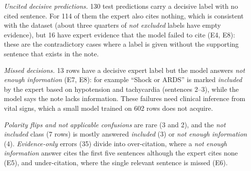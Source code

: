\emph{Uncited decisive predictions.} 130 test predictions carry a decisive label with no cited sentence. For 114 of them the expert also cites nothing, which is consistent with the dataset (about three quarters of \emph{not excluded} labels have empty evidence), but 16 have expert evidence that the model failed to cite (E4, E8): these are the contradictory cases where a label is given without the supporting sentence that exists in the note.

\emph{Missed decisions.} 13 rows have a decisive expert label but the model answers \emph{not enough information} (E7, E8): for example ``Shock or ARDS'' is marked \emph{included} by the expert based on hypotension and tachycardia (sentences 2--3), while the model says the note lacks information. These failures need clinical inference from vital signs, which a small model trained on 602 rows does not acquire.

\emph{Polarity flips and \emph{not applicable} confusions} are rare (3 and 2), and the \emph{not included} class (7 rows) is mostly answered \emph{included} (3) or \emph{not enough information} (4). \emph{Evidence-only} errors (35) divide into over-citation, where a \emph{not enough information} answer cites the first five sentences although the expert cites none (E5), and under-citation, where the single relevant sentence is missed (E6).

\begin{table}[t]\centering\caption{Config.~A test errors by category (all 206 rows; ``correct'' means label and evidence both match).}\label{tab:errcatA}
\small\end{table}
\begin{table}[t]\centering\caption{Config.~A: twelve representative errors (evidence lists are sentence IDs; Expert/Model columns show label and IDs).}\label{tab:errA}
\scriptsize\end{table}

